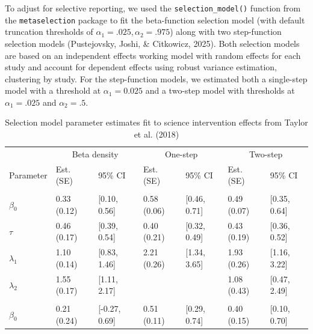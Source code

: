 \documentclass[
  american,
  man, donotrepeattitle,floatsintext]{apa7}
\begin{document}
To adjust for selective reporting, we used the \texttt{selection\_model()} function from the \texttt{metaselection} package to fit the beta-function selection model (with default truncation thresholds of \(\alpha_1 = .025, \alpha_2 = .975\)) along with two step-function selection models (Pustejovsky, Joshi, \& Citkowicz, 2025). Both selection models are based on an independent effects working model with random effects for each study and account for dependent effects using robust variance estimation, clustering by study. For the step-function models, we estimated both a single-step model with a threshold at \(\alpha_1 = 0.025\) and a two-step model with thresholds at \(\alpha_1 = .025\) and \(\alpha_2 = .5\).

\begin{table}
\centering
\caption{\label{tab:science-learning-res}Selection model parameter estimates fit to science intervention effects from Taylor et al. (2018)}
\centering
\begin{tabular}[t]{lllllll}
\toprule
\multicolumn{1}{c}{ } & \multicolumn{2}{c}{Beta density} & \multicolumn{2}{c}{One-step} & \multicolumn{2}{c}{Two-step} \\
\cmidrule(l{3pt}r{3pt}){2-3} \cmidrule(l{3pt}r{3pt}){4-5} \cmidrule(l{3pt}r{3pt}){6-7}
Parameter & Est. (SE) & 95\% CI & Est. (SE) & 95\% CI & Est. (SE) & 95\% CI\\
\midrule
\addlinespace[0.3em]
\multicolumn{7}{l}{\textbf{Summary meta-analysis}}\\
\hspace{1em}$\beta_0$ & 0.33 (0.12) & {}[0.10, 0.56] & 0.58 (0.06) & {}[0.46, 0.71] & 0.49 (0.07) & {}[0.35, 0.64]\\
\hspace{1em}$\tau$ & 0.46 (0.17) & {}[0.39, 0.54] & 0.40 (0.21) & {}[0.32, 0.49] & 0.43 (0.19) & {}[0.36, 0.52]\\
\hspace{1em}$\lambda_1$ & 1.10 (0.14) & {}[0.83, 1.46] & 2.21 (0.26) & {}[1.34, 3.65] & 1.93 (0.26) & {}[1.16, 3.22]\\
\hspace{1em}$\lambda_2$ & 1.55 (0.17) & {}[1.11, 2.17] &  &  & 1.08 (0.43) & {}[0.47, 2.49]\\
\addlinespace[0.3em]
\multicolumn{7}{l}{\textbf{Moderator analysis}}\\
\hspace{1em}$\beta_0$ & 0.21 (0.24) & {}[-0.27, 0.69] & 0.51 (0.11) & {}[0.29, 0.74] & 0.40 (0.15) & {}[0.10, 0.70]\\

\end{tabular}
\end{table}
\end{document}
